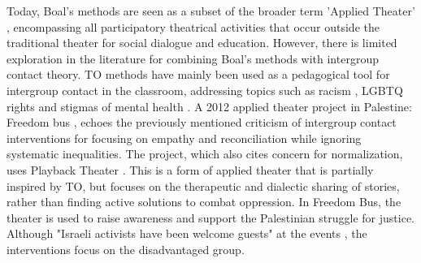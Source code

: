 \documentclass[dissertation,math,vertlayout,pdfa,colorlinks]{aaltoseries}
\begin{document}
Today, Boal's methods are seen as a subset of the broader term 'Applied Theater' \cite{gjaerumAppliedTheatreResearch2013}, encompassing all participatory theatrical activities that occur outside the traditional theater for social dialogue and education. However, there is limited exploration in the literature for combining Boal's methods with intergroup contact theory. TO methods have mainly been used as a pedagogical tool for intergroup contact in the classroom, addressing topics such as racism \cite{abramsPrejudiceReductionCollective2012}, LGBTQ rights \cite{abramsPrejudiceReductionCollective2012,garciaOppressionPedagogyIntergroup2019} and stigmas of mental health \cite{nordstromVoicesProjectUsing2021}. A 2012 applied theater project in Palestine: Freedom bus \cite{riversNarrativePowerPlayback2015}, echoes the previously mentioned criticism of intergroup contact interventions for focusing on empathy and reconciliation while ignoring systematic inequalities. The project, which also cites concern for normalization, uses Playback Theater \cite{sajnaniOpeningPlaybackTheatre2011}. This is a form of applied theater that is partially inspired by TO, but focuses on the therapeutic and dialectic sharing of stories, rather than finding active solutions to combat oppression. In Freedom Bus, the theater is used to raise awareness and support the Palestinian struggle for justice. Although "Israeli activists have been welcome guests" at the events \cite[p. 159]{riversNarrativePowerPlayback2015}, the interventions focus on the disadvantaged group. 
\end{document}
